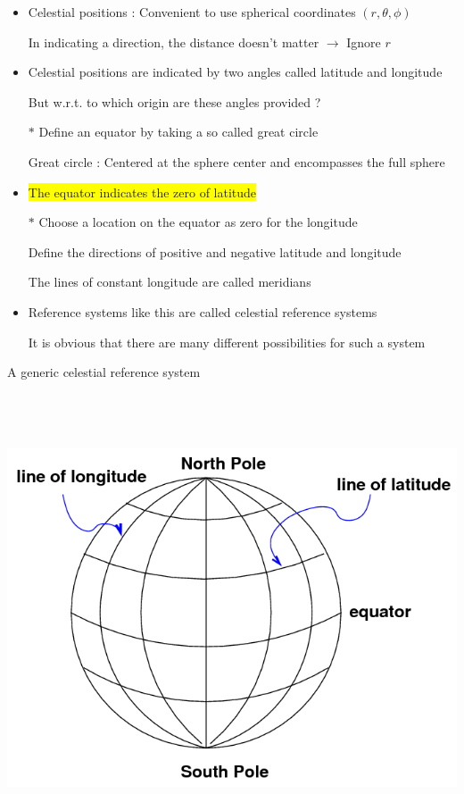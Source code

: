 \onecolumn
\begin{itemize}
\item Celestial positions : Convenient to use spherical coordinates $(r,\theta,\phi)$
\item[] In indicating a direction, the distance doesn't matter $\rightarrow$ Ignore $r$
\item Celestial positions are indicated by two angles called {\blue latitude} and {\blue longitude}
\item[] But w.r.t. to which origin are these angles provided ?
\item[$\ast$] Define an {\blue equator} by taking a so called {\blue great circle}
\item[] Great circle : Centered at the sphere center and encompasses the full sphere
\item \colorbox{yellow}{The equator indicates the zero of latitude}
\item[$\ast$] {\blue Choose a location on the equator as zero for the longitude}
\item[] Define the directions of positive and negative latitude and longitude
\item[] The lines of constant longitude are called {\blue meridians}
\item Reference systems like this are called {\blue celestial reference systems}
\item[] It is obvious that there are many different possibilities for such a system 
\end{itemize}

\Tr
\onecolumn
\begin{center}
{\blue A generic celestial reference system}\\[3mm]
\includegraphics[keepaspectratio,height=14cm]{gen-ref}
\end{center}

